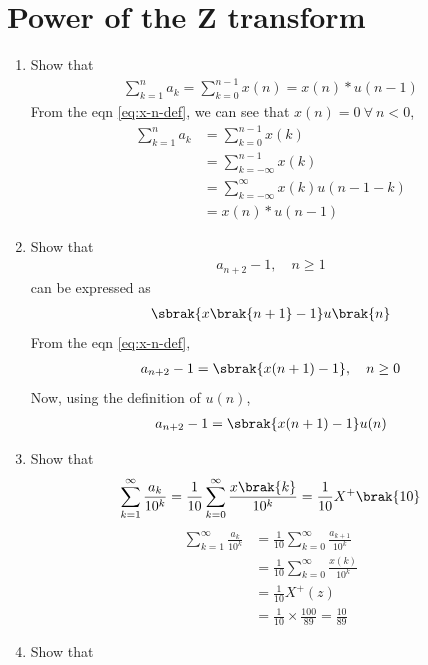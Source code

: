 \documentclass[journal,12pt,twocolumn]{IEEEtran}
\renewcommand\thesection{\arabic{section}}
\begin{document}
\section{Power of the Z transform}
\begin{enumerate}[label=\thesection.\arabic*,ref=\thesection.\theenumi]
\item Show that 
\begin{align}
	\sum_{k=1}^{n}a_k = 
	\sum_{k=0}^{n-1}x(n) = x(n)*u(n-1)
\end{align}
\solution From the eqn \eqref{eq:x-n-def}, we can see that $x(n) = 0\ \forall\ n < 0$,
\begin{align}
	\sum_{k=1}^{n}a_k &= \sum_{k=0}^{n-1}x(k) \\
	&= \sum_{k = -\infty}^{n - 1}x(k) \\
	&= \sum_{k = -\infty}^{\infty}x(k)u(n - 1 - k) \\
	&= x(n)*u(n - 1)
\end{align}
\item Show that 
\begin{align}
	a_{n+2}-1, \quad n \ge 1
\end{align}
can be expressed as 
\begin{align}
	\sbrak{x\brak{n+1}-1}u\brak{n}
\end{align}
\solution From the eqn \eqref{eq:x-n-def},
\begin{align}
	a_{n+2} - 1 = \sbrak{x(n + 1) - 1}, \quad n \ge 0
\end{align}
Now, using the definition of $u(n)$,
\begin{align}
	a_{n+2} - 1 = \sbrak{x(n + 1) - 1}u(n)
\end{align}
\item Show that 
\begin{align}
	\sum_{k=1}^{\infty}\frac{a_k}{10^k}= 
	\frac{1}{10}\sum_{k=0}^{\infty}\frac{x\brak{k}}{10^k} =\frac{1}{10}X^{+}\brak{{10}}
\end{align}
\label{pr:1-2}
\solution 
\begin{align}
	\sum_{k=1}^{\infty}\frac{a_k}{10^k} &= \frac{1}{10}\sum_{k = 0}^{\infty}\frac{a_{k+1}}{10^k} \\
	&= \frac{1}{10}\sum_{k = 0}^{\infty}\frac{x(k)}{10^k} \\
	&= \frac{1}{10}X^+(z) \\
	&= \frac{1}{10}\times\frac{100}{89} = \frac{10}{89}
\end{align}
\item Show that 

\end{enumerate}
\end{document}
